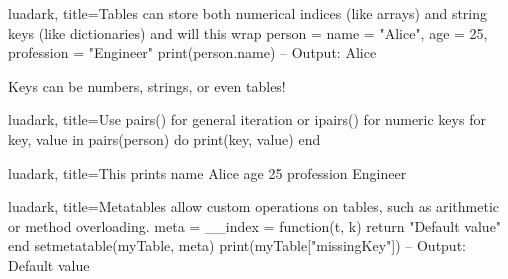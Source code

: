 \begin{NxSSBox}
	\begin{NxCodeBox}{lua}{dark, title={Tables can store both numerical indices (like arrays) and string keys (like dictionaries) and will this wrap}}
		person = {
		    name = "Alice",
		    age = 25,
		    profession = "Engineer"
		}
		print(person.name) -- Output: Alice
	\end{NxCodeBox}
	\begin{NxIDBox}
		Keys can be numbers, strings, or even tables!
	\end{NxIDBox}
\end{NxSSBox}

\begin{NxSSBox}
	\begin{NxCodeBox}{lua}{dark, title={Use pairs() for general iteration or ipairs() for numeric keys}}
		for key, value in pairs(person) do
		    print(key, value)
		end
	\end{NxCodeBox}
\end{NxSSBox}

\begin{NxSSBox}
	\begin{NxCodeBox}{lua}{dark, title=This prints}
			name    Alice
			age     25
			profession   Engineer
	\end{NxCodeBox}
\end{NxSSBox}

\begin{NxSSBox}
	\begin{NxCodeBox}{lua}{dark, title={Metatables allow custom operations on tables, such as arithmetic or method overloading.}}
		meta = {
		    __index = function(t, k)
			return "Default value"
		    end
		}
		setmetatable(myTable, meta)
		print(myTable["missingKey"]) -- Output: Default value
	\end{NxCodeBox}
\end{NxSSBox}

